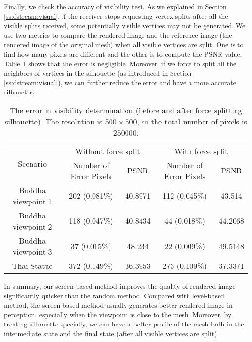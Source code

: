 Finally, we check the accuracy of visibility test. 
As we explained in Section \ref{ss:dstream:visual}, 
if the receiver stops requesting vertex splits after all the visible splits received,
some potentially visible vertices may not be generated.
We use two metrics to compare the rendered image and the reference image (the rendered image of the original mesh)
when all visible vertices are split. One is to find
how many pixels are different and the other is to compute the PSNR value. 
Table \ref{t:dstream:error} shows that the error is negligible.
Moreover, if we force to split all the neighbors of vertices in the silhouette
(as introduced in Section \ref{ss:dstream:visual}),
we can further reduce the error and have a more accurate silhouette.
\begin{table}
    \centering
    \begin{tabular}{|c|c|c|c|c|}
        \hline
        \multirow{2}{*}{Scenario}    &    \multicolumn{2}{c|}{Without force split}   & \multicolumn{2}{c|}{With force split}\\
        \cline{2-5}
         &   Number of Error Pixels   &   PSNR    &  Number of Error Pixels  & PSNR \\
        \hline
        Buddha viewpoint 1 &          202 (0.081\%)    &   40.8971 &  112 (0.045\%)               &    43.514\\
        Buddha viewpoint 2 &          118 (0.047\%)    &   40.8434 &  44  (0.018\%)               &    44.2068\\
        Buddha viewpoint 3 &           37 (0.015\%)    &   48.234  &  22  (0.009\%)               &    49.5148\\
        Thai   Statue      &          372 (0.149\%)    &   36.3953 &  273 (0.109\%)               &    37.3371\\
        \hline
    \end{tabular}
    \caption[The error in visibility determination (before and after force splitting silhouette)]
    {The error in visibility determination (before and after force splitting silhouette).
    The resolution is $500 \times 500$, so the total number of pixels is $250000$.}
    \label{t:dstream:error}
\end{table}

In summary, our screen-based method improves the quality of rendered image significantly quicker than the random method. Compared
with level-based method, the screen-based method usually generates better rendered image in perception, especially when the viewpoint is close to the mesh. 
Moreover, by treating silhouette specially, we can have a better profile of the mesh both in the intermediate state and the final state (after
all visible vertices are split). 


